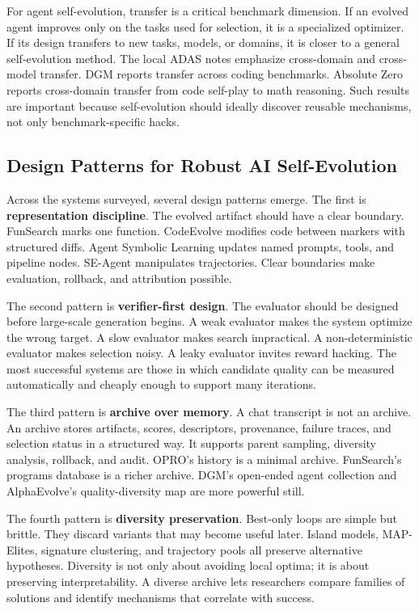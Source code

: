 For agent self-evolution, transfer is a critical benchmark dimension.  If an evolved agent improves only on the tasks used for selection, it is a specialized optimizer.  If its design transfers to new tasks, models, or domains, it is closer to a general self-evolution method.  The local ADAS notes emphasize cross-domain and cross-model transfer.  DGM reports transfer across coding benchmarks.  Absolute Zero reports cross-domain transfer from code self-play to math reasoning.  Such results are important because self-evolution should ideally discover reusable mechanisms, not only benchmark-specific hacks.

\subsection{Design Patterns for Robust AI Self-Evolution}
\label{subsec:evolution-design-patterns}

Across the systems surveyed, several design patterns emerge.  The first is \textbf{representation discipline}.  The evolved artifact should have a clear boundary.  FunSearch marks one function.  CodeEvolve modifies code between markers with structured diffs.  Agent Symbolic Learning updates named prompts, tools, and pipeline nodes.  SE-Agent manipulates trajectories.  Clear boundaries make evaluation, rollback, and attribution possible.

The second pattern is \textbf{verifier-first design}.  The evaluator should be designed before large-scale generation begins.  A weak evaluator makes the system optimize the wrong target.  A slow evaluator makes search impractical.  A non-deterministic evaluator makes selection noisy.  A leaky evaluator invites reward hacking.  The most successful systems are those in which candidate quality can be measured automatically and cheaply enough to support many iterations.

The third pattern is \textbf{archive over memory}.  A chat transcript is not an archive.  An archive stores artifacts, scores, descriptors, provenance, failure traces, and selection status in a structured way.  It supports parent sampling, diversity analysis, rollback, and audit.  OPRO's history is a minimal archive.  FunSearch's programs database is a richer archive.  DGM's open-ended agent collection and AlphaEvolve's quality-diversity map are more powerful still.

The fourth pattern is \textbf{diversity preservation}.  Best-only loops are simple but brittle.  They discard variants that may become useful later.  Island models, MAP-Elites, signature clustering, and trajectory pools all preserve alternative hypotheses.  Diversity is not only about avoiding local optima; it is about preserving interpretability.  A diverse archive lets researchers compare families of solutions and identify mechanisms that correlate with success.

